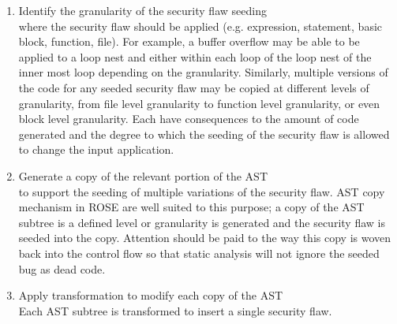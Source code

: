 \begin{enumerate}
               \item Identify the granularity of the security flaw seeding \\ 
                     where the security flaw should be applied
                     (e.g. expression, statement, basic block, function, file).
                     For example, a buffer overflow may be able to be applied to a loop
                     nest and either within each loop of the loop nest of the inner most
                     loop depending on the granularity.  Similarly, multiple versions
                     of the code for any seeded security flaw may be copied at different
                     levels of granularity, from file level granularity to function
                     level granularity, or even block level granularity.  Each have
                     consequences to the amount of code generated and the degree to which
                     the seeding of the security flaw is allowed to change the input
                     application.
 
               \item Generate a copy of the relevant portion of the AST \\
                     to support the seeding of multiple variations of the security flaw.
                     AST copy mechanism in ROSE are well suited to this purpose; a copy of
                     the AST subtree is a defined level or granularity is generated and
                     the security flaw is seeded into the copy. Attention should be
                     paid to the way this copy is woven back into the control flow so that
                     static analysis will not ignore the seeded bug as dead code.

               \item Apply transformation to modify each copy of the AST \\
                     Each AST subtree is transformed to insert a single security flaw.

            \end{enumerate}

